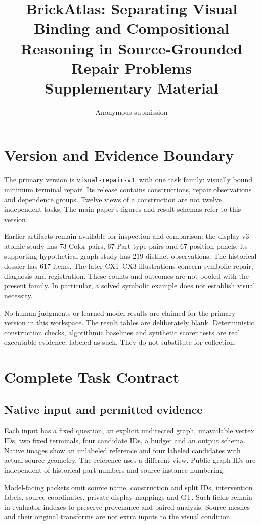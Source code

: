 \documentclass[10pt,twocolumn,letterpaper]{article}
\title{BrickAtlas: Separating Visual Binding and Compositional\\
Reasoning in Source-Grounded Repair Problems\\Supplementary Material}
\author{Anonymous submission}
\begin{document}
\maketitle
\raggedbottom

\section{Version and Evidence Boundary}
The primary version is \texttt{visual-repair-v1}, with one task family:
visually bound minimum terminal repair. Its release contains
\VRConstructions{} constructions, \VRObservations{} repair observations
and \VRGroups{} dependence groups. Twelve views of a construction
are not twelve independent tasks. The main paper's figures and
result schemas refer to this version.

Earlier artifacts remain available for inspection and comparison:
the display-v3 atomic study has 73 Color pairs, 67 Part-type pairs
and 67 position panels; its supporting hypothetical graph study has
219 distinct observations. The historical dossier has 617 items.
The later CX1--CX3 illustrations concern symbolic repair, diagnosis
and registration. These counts and outcomes are not pooled with
the present family. In particular, a solved symbolic example does
not establish visual necessity.

No human judgments or learned-model results are claimed for the
primary version in this workspace. The result tables are deliberately
blank. Deterministic construction checks, algorithmic baselines and
synthetic scorer tests are real executable evidence, labeled as such.
They do not substitute for collection.

\section{Complete Task Contract}
\subsection{Native input and permitted evidence}
Each input has a fixed question, an explicit undirected graph,
unavailable vertex IDs, two fixed terminals, four candidate IDs,
a budget and an output schema. Native images show an unlabeled
reference and four labeled candidates with actual source geometry.
The reference uses a different view. Public graph IDs are independent
of historical part numbers and source-instance numbering.

Model-facing packets omit source name, construction and split IDs,
intervention labels, source coordinates, private display mappings
and GT. Such fields remain in evaluator indexes to preserve provenance
and paired analysis. Source meshes and their original transforms
are not extra inputs to the visual condition.
\end{document}
